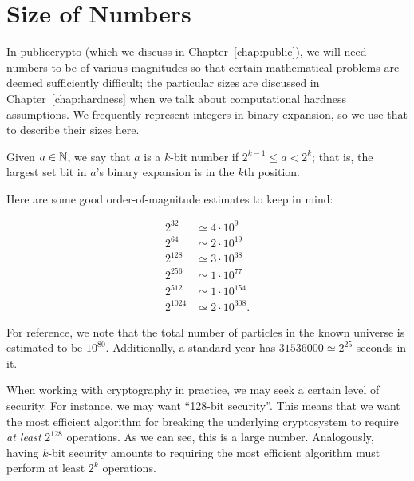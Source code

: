 \section{Size of Numbers}

In \gls{publiccrypto} (which we discuss in Chapter~\ref{chap:public}),
we will need numbers to be of various magnitudes so that certain
mathematical problems are deemed sufficiently difficult;
the particular sizes are discussed in Chapter~\ref{chap:hardness}
when we talk about computational hardness assumptions.
We frequently represent integers in binary expansion,
so we use that to describe their sizes here.

Given $a\in\mathbb{N}$, we say that $a$ is a $k$-bit number if
$2^{k-1} \le a < 2^{k}$;
that is, the largest set bit in $a$'s binary expansion
is in the $k$th position.

\begin{example}

Here are some good order-of-magnitude estimates to keep in mind:

\begin{align}
    2^{32}   &\simeq 4\cdot10^{9}   \nonumber\\
    2^{64}   &\simeq 2\cdot10^{19}  \nonumber\\
    2^{128}  &\simeq 3\cdot10^{38}  \nonumber\\
    2^{256}  &\simeq 1\cdot10^{77}  \nonumber\\
    2^{512}  &\simeq 1\cdot10^{154} \nonumber\\
    2^{1024} &\simeq 2\cdot10^{308}.
\end{align}

\noindent
For reference, we note that the total number of particles
in the known universe is estimated to be $10^{80}$.
Additionally, a standard year has $31536000 \simeq 2^{25}$ seconds in it.
\end{example}

When working with cryptography in practice,
we may seek a certain level of security.
For instance, we may want ``128-bit security''.
This means that we want the most efficient algorithm for breaking
the underlying cryptosystem to require \emph{at least} $2^{128}$ operations.
As we can see, this is a large number.
Analogously, having $k$-bit security amounts to requiring
the most efficient algorithm must perform at least $2^{k}$ operations.

